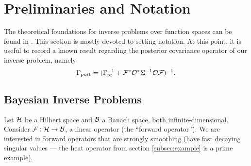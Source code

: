 \documentclass{amsart}
\numberwithin{equation}{section}
\begin{document}

\section{Preliminaries and Notation}\label{section:prelim}

The theoretical foundations for inverse problems over function spaces
can be found in \cite{Stuart10}. This section is mostly devoted to
setting notation. At this point, it is useful to record a known result
regarding the posterior covariance operator of our inverse problem,
namely
\begin{align}\label{eq:postcov precursor}
  \Gamma_{\textup{post}} = (\Gamma_{\textup{pr}}^{-1} + \mathcal{F}^* \mathcal{O}^* \Sigma^{-1} \mathcal{O} \mathcal{F} )^{-1}.
\end{align}

\subsection{Bayesian Inverse Problems}\label{section:abstract OED}
Let $\mathcal{H}$ be a Hilbert space and $\mathcal{B}$ a Banach space, both
infinite-dimensional. Consider $\mathcal{F}: \mathcal{H} \to \mathcal{B}$, a linear
operator (the ``forward operator''). We are interested in forward
operators that are strongly smoothing (have fast decaying singular
values --- the heat operator from section \ref{subsec:example} is a
prime example).
\end{document}

